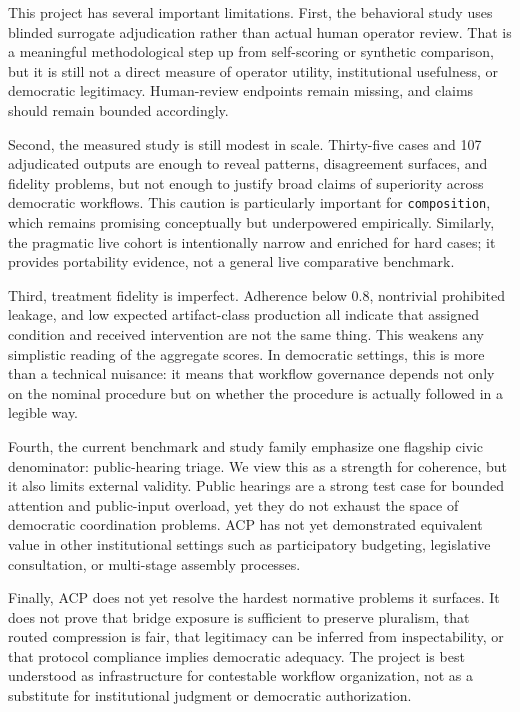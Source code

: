 \documentclass[11pt]{article}
\newcommand{\subsectiongray}[1]{%
  \vspace{2.5ex plus 0.5ex}%
  \noindent{\normalfont\large\color{gray}#1}%
  \vspace{0.6ex}\par\noindent%
}
\begin{document}
\subsectiongray{Limitations}

This project has several important limitations. First, the behavioral study uses blinded surrogate adjudication rather than actual human operator review. That is a meaningful methodological step up from self-scoring or synthetic comparison, but it is still not a direct measure of operator utility, institutional usefulness, or democratic legitimacy. Human-review endpoints remain missing, and claims should remain bounded accordingly.

\vspace{0.1in}
Second, the measured study is still modest in scale. Thirty-five cases and 107 adjudicated outputs are enough to reveal patterns, disagreement surfaces, and fidelity problems, but not enough to justify broad claims of superiority across democratic workflows. This caution is particularly important for \texttt{composition}, which remains promising conceptually but underpowered empirically. Similarly, the pragmatic live cohort is intentionally narrow and enriched for hard cases; it provides portability evidence, not a general live comparative benchmark.

\vspace{0.1in}
Third, treatment fidelity is imperfect. Adherence below 0.8, nontrivial prohibited leakage, and low expected artifact-class production all indicate that assigned condition and received intervention are not the same thing. This weakens any simplistic reading of the aggregate scores. In democratic settings, this is more than a technical nuisance: it means that workflow governance depends not only on the nominal procedure but on whether the procedure is actually followed in a legible way.

\vspace{0.1in}
Fourth, the current benchmark and study family emphasize one flagship civic denominator: public-hearing triage. We view this as a strength for coherence, but it also limits external validity. Public hearings are a strong test case for bounded attention and public-input overload, yet they do not exhaust the space of democratic coordination problems. ACP has not yet demonstrated equivalent value in other institutional settings such as participatory budgeting, legislative consultation, or multi-stage assembly processes.

\vspace{0.1in}
Finally, ACP does not yet resolve the hardest normative problems it surfaces. It does not prove that bridge exposure is sufficient to preserve pluralism, that routed compression is fair, that legitimacy can be inferred from inspectability, or that protocol compliance implies democratic adequacy. The project is best understood as infrastructure for contestable workflow organization, not as a substitute for institutional judgment or democratic authorization.
\end{document}

